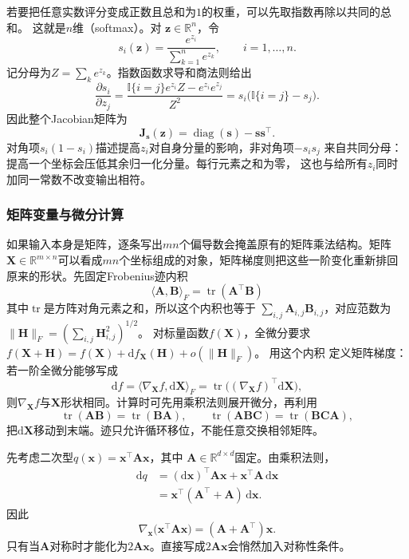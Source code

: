 若要把任意实数评分变成正数且总和为$1$的权重，可以先取指数再除以共同的总和。
这就是$n$维（softmax）。对
$\bm{z}\in\mathbb{R}^n$，令
\[
  s_i(\bm{z})
  =
  \frac{e^{z_i}}{\sum_{k=1}^n e^{z_k}},
  \qquad i=1,\ldots,n.
\]
记分母为$Z=\sum_k e^{z_k}$。指数函数求导和商法则给出
\[
  \frac{\partial s_i}{\partial z_j}
  =
  \frac{\mathbb{I}\{i=j\}e^{z_i}Z-e^{z_i}e^{z_j}}{Z^2}
  =
  s_i\bigl(\mathbb{I}\{i=j\}-s_j\bigr).
\]
因此整个Jacobian矩阵为
\begin{equation}
  \bm{J}_{\bm{s}}(\bm{z})
  =
  \operatorname{diag}(\bm{s})-\bm{s}\bm{s}^{\top}.
\label{eq:analysis-softmax-jacobian}
\end{equation}
对角项$s_i(1-s_i)$描述提高$z_i$对自身分量的影响，非对角项$-s_is_j$
来自共同分母：提高一个坐标会压低其余归一化分量。每行元素之和为零，
这也与给所有$z_i$同时加同一常数不改变输出相符。
\subsubsection{矩阵变量与微分计算}

如果输入本身是矩阵，逐条写出$mn$个偏导数会掩盖原有的矩阵乘法结构。矩阵$\bm{X}\in\mathbb{R}^{m\times n}$可以看成$mn$个坐标组成的对象，矩阵梯度则把这些一阶变化重新排回原来的形状。先固定Frobenius迹内积
\[   \langle\bm{A},\bm{B}\rangle_F   =   \operatorname{tr}(\bm{A}^{\top}\bm{B}) \]
其中$\operatorname{tr}$是方阵对角元素之和，所以这个内积也等于
$\sum_{i,j}\bm A_{i,j}\bm B_{i,j}$，对应范数为
$\lVert\bm H\rVert_F=(\sum_{i,j}\bm H_{i,j}^2)^{1/2}$。
对标量函数$f(\bm X)$，全微分要求
$f(\bm X+\bm H)=f(\bm X)+\mathrm df_{\bm X}(\bm H)+o(\lVert\bm H\rVert_F)$。
用这个内积
定义矩阵梯度：若一阶全微分能够写成
\begin{equation}
  \mathrm{d}f
  =
  \langle\nabla_{\bm{X}}f,\mathrm{d}\bm{X}\rangle_F
  =
  \operatorname{tr}\bigl((\nabla_{\bm{X}}f)^{\top}
  \mathrm{d}\bm{X}\bigr),
\label{eq:analysis-matrix-gradient-definition}
\end{equation}
则$\nabla_{\bm{X}}f$与$\bm{X}$形状相同。计算时可先用乘积法则展开微分，再利用
\[   \operatorname{tr}(\bm{A}\bm{B})   =\operatorname{tr}(\bm{B}\bm{A}),\qquad   \operatorname{tr}(\bm{A}\bm{B}\bm{C})   =\operatorname{tr}(\bm{B}\bm{C}\bm{A}), \]
把$\mathrm{d}\bm{X}$移动到末端。迹只允许循环移位，不能任意交换相邻矩阵。

先考虑二次型$q(\bm{x})=\bm{x}^{\top}\bm{A}\bm{x}$，其中 $\bm{A}\in\mathbb{R}^{d\times d}$固定。由乘积法则，
\begin{align*}
  \mathrm{d}q
  &=
  (\mathrm{d}\bm{x})^{\top}\bm{A}\bm{x}
  +\bm{x}^{\top}\bm{A}\,\mathrm{d}\bm{x}\\
  &=
  \bm{x}^{\top}(\bm{A}^{\top}+\bm{A})\,\mathrm{d}\bm{x}.
\end{align*}
因此
\begin{equation}
  \nabla_{\bm{x}}
  \bigl(\bm{x}^{\top}\bm{A}\bm{x}\bigr)
  =
  (\bm{A}+\bm{A}^{\top})\bm{x}.
\label{eq:analysis-quadratic-form-gradient}
\end{equation}
只有当$\bm{A}$对称时才能化为$2\bm{A}\bm{x}$。直接写成$2\bm{A}\bm{x}$会悄然加入对称性条件。

